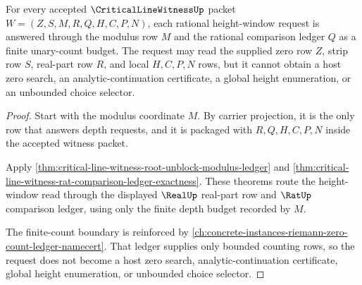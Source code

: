 \begin{theorem}
\label{thm:criticallinewitness-rational-height-window}
For every accepted $\CriticalLineWitnessUp$ packet $W=(Z,S,M,R,Q,H,C,P,N)$, each rational height-window request is answered through the modulus row $M$ and the rational comparison ledger $Q$ as a finite unary-count budget. The request may read the supplied zero row $Z$, strip row $S$, real-part row $R$, and local $H,C,P,N$ rows, but it cannot obtain a host zero search, an analytic-continuation certificate, a global height enumeration, or an unbounded choice selector.
\end{theorem}
\begin{proof}
Start with the modulus coordinate $M$. By carrier projection, it is the only row that answers depth requests, and it is packaged with $R,Q,H,C,P,N$ inside the accepted witness packet.

Apply \autoref{thm:critical-line-witness-root-unblock-modulus-ledger} and \autoref{thm:critical-line-witness-rat-comparison-ledger-exactness}. These theorems route the height-window read through the displayed $\RealUp$ real-part row and $\RatUp$ comparison ledger, using only the finite depth budget recorded by $M$.

The finite-count boundary is reinforced by \autoref{ch:concrete-instances-riemann-zero-count-ledger-namecert}. That ledger supplies only bounded counting rows, so the request does not become a host zero search, analytic-continuation certificate, global height enumeration, or unbounded choice selector.
\end{proof}

